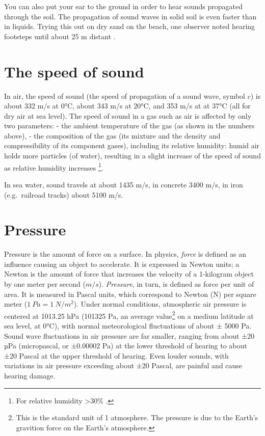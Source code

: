 \documentclass[
]{book}
\begin{document}
You can also put your ear to the ground in order to hear sounds propagated through the soil. The propagation of sound waves in solid soil is even faster than in liquids. Trying this out on dry sand on the beach, one observer noted hearing footsteps until about 25 m distant \citep[§10]{Minnaert_1970v2}.

\section{The speed of sound}\label{sec:speedofsound}

In air, the speed of sound (the speed of propagation of a sound wave, symbol \(c\)) is about 332 m/s at 0°C, about 343 m/s at 20°C, and 353 m/s at at 37°C \citep{Shadle_2010} (all for dry air at sea level).
The speed of sound in a gas such as air is affected by only two parameters:
- the ambient temperature of the gas (as shown in the numbers above),
- the composition of the gas (its mixture and the density and compressibility of its component gases), including its relative humidity: humid air holds more particles (of water), resulting in a slight increase of the speed of sound as relative humidity increases \citep{Harris_1971}\footnote{For relative humidity \textgreater30\% \citep{Harris_1971}.}.

In sea water, sound travels at about 1435 m/s, in concrete 3400 m/s, in iron (e.g.~railroad tracks) about 5100 m/s.

\section{Pressure}\label{sec:pressure}

Pressure is the amount of force on a surface. In physics, \emph{force} is defined as an influence causing an object to accelerate. It is expressed in Newton units; a Newton is the amount of force that increases the velocity of a 1-kilogram object by one meter per second (\(m/s\)). \emph{Pressure}, in turn, is defined as force per unit of area. It is measured in Pascal units, which correspond to Newton (N) per square meter (\(1\ Pa = 1\ N/m^2\)).
Under normal conditions, atmospheric air pressure is centered at 1013.25 hPa (101325 Pa, an average value\footnote{This is the standard unit of 1 atmosphere. The pressure is due to the Earth's gravition force on the Earth's atmosphere.} on a medium latitude at sea level, at 0°C), with normal meteorological fluctuations of about ± 5000 Pa. Sound wave fluctuations in air pressure are far smaller, ranging from about ±20 µPa (micropascal, or ±0.00002 Pa) at the lower threshold of hearing to about ±20 Pascal at the upper threshold of hearing. Even louder sounds, with variations in air pressure exceeding about ±20 Pascal, are painful and cause hearing damage.
\end{document}
